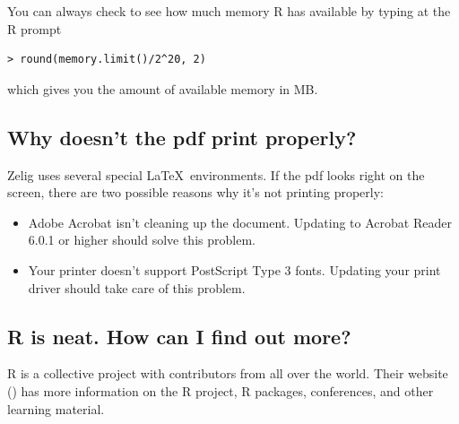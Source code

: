 You can always check to see how much memory R has available by typing
at the R prompt
\begin{verbatim}
> round(memory.limit()/2^20, 2)
\end{verbatim}
which gives you the amount of available memory in MB.  




\subsection*{Why doesn't the pdf print properly?} 

Zelig uses several special \LaTeX\ environments.  If the pdf looks right
on the screen, there are two possible reasons why it's not printing
properly:  
\begin{itemize}
\item Adobe Acrobat isn't cleaning up the document.  Updating to
  Acrobat Reader 6.0.1 or higher should solve this problem.  
\item Your printer doesn't support PostScript Type 3 fonts.  Updating
  your print driver should take care of this problem.  
\end{itemize}

\subsection*{R is neat.  How can I find out more?}

R is a collective project with contributors from all over the world.
Their website
() has more
information on the R project, R packages, conferences, and other
learning material.

